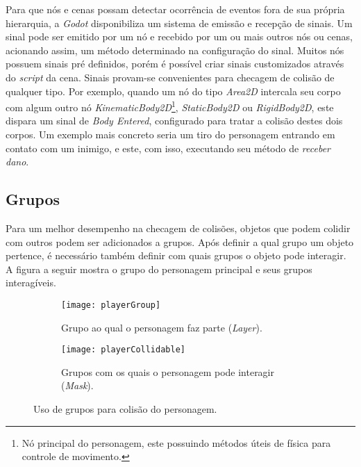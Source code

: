 Para que nós e cenas possam detectar ocorrência de eventos fora de sua própria hierarquia, a \textit{Godot} disponibiliza um sistema de emissão e recepção de sinais. Um sinal pode ser emitido por um nó e recebido por um ou mais outros nós ou cenas, acionando assim, um método determinado na configuração do sinal. Muitos nós possuem sinais pré definidos, porém é possível criar sinais customizados através do \textit{script} da cena. Sinais provam-se convenientes para checagem de colisão de qualquer tipo. Por exemplo, quando um nó do tipo \textit{Area2D} intercala seu corpo com algum outro nó \textit{KinematicBody2D}\footnote{
    Nó principal do personagem, este possuindo métodos úteis de física para controle de movimento.
}, \textit{StaticBody2D} ou \textit{RigidBody2D}, este dispara um sinal de \textit{Body Entered}, configurado para tratar a colisão destes dois corpos. Um exemplo mais concreto seria um tiro do personagem entrando em contato com um inimigo, e este, com isso, executando seu método de \textit{receber dano}.

\subsection{Grupos}\label{Grupos}

Para um melhor desempenho na checagem de colisões, objetos que podem colidir com outros podem ser adicionados a grupos. Após definir a qual grupo um objeto pertence, é necessário também definir com quais grupos o objeto pode interagir. A figura a seguir mostra o grupo do personagem principal e seus grupos interagíveis.

\begin{figure}
    \centering
  
    \begin{subfigure}{0.4\textwidth}
        \centering
            \texttt{[image: playerGroup]}
        \caption{Grupo ao qual o personagem faz parte (\textit{Layer}).}
    \end{subfigure}
    \begin{subfigure}{0.4\textwidth}
        \centering
            \texttt{[image: playerCollidable]}
        \caption{Grupos com os quais o personagem pode interagir (\textit{Mask}).}
    \end{subfigure}
  
    \caption{Uso de grupos para colisão do personagem.}
\end{figure}


